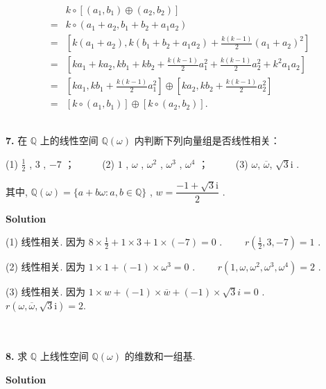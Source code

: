 \documentclass[11pt,a4paper,openany,oneside]{book}
\newcommand{\ii}{\mathrm i}
\newcommand\Solution{\noindent\textbf{\textsf{Solution}}\par\medskip}
\begin{document}
\begin{enumerate}[(\romannumeral1)]
\begin{align*}
&k\circ[(a_1,b_1)\oplus(a_2,b_2)]\\
=&k\circ(a_1+a_2,b_1+b_2+a_1a_2)\\
=&\left[k(a_1+a_2),k(b_1+b_2+a_1a_2)+\frac{k(k-1)}{2}(a_1+a_2)^2\right]\\
=&\left[ka_1+ka_2,kb_1+kb_2+\frac{k(k-1)}{2}a_1^2+\frac{k(k-1)}{2}a_2^2+k^2a_1a_2\right]\\
=&\left[ka_1,kb_1+\frac{k(k-1)}{2}a_1^2\right]\oplus\left[ka_2,kb_2+\frac{k(k-1)}{2}a_2^2\right]\\
=&[k\circ(a_1,b_1)]\oplus [k\circ(a_2,b_2)].\\ \\ \\
\end{align*}
\end{enumerate}




\begin{myexample}
\textbf{7.} 
在  $ \mathbb{Q} $ 上的线性空间  $ \mathbb{Q}(\omega) $ 内判断下列向量组是否线性相关： 

(1)  $ \frac{1}{2} $ ,  $ 3 $ ,  $ -7 $ ；  \ \ \ \ \ (2)  $ 1 $ ,  $ \omega $ ,  $ \omega^2 $ ,  $ \omega^3 $ ,  $ \omega^4 $ ；  \ \ \ \ \ (3)  $ \omega$, $\overline{\omega}$, $\sqrt{3}\ii $  . 

其中,  $ \mathbb{Q} (\omega) = \{a+b\omega: a, b \in \mathbb{Q} \} $ ,  $ w = \dfrac{-1+\sqrt{3}\ii}{2} $ . 
\end{myexample}
\Solution

(1) 线性相关. 因为 $ 8\times \frac{1}{2} + 1\times3 + 1\times(-7) = 0 $ . \ \ \ \  $ r(\tfrac{1}{2}, 3, -7) = 1 $ .

(2) 线性相关. 因为 $ 1\times1 + (-1)\times \omega^3 = 0 $  . \ \ \ \  $ r( 1, \omega, \omega^2, \omega^3, \omega^4)=2 $ . 

(3) 线性相关. 因为 $ 1\times w + (-1)\times \overline{w} + (-1)\times \sqrt{3}i = 0 $ . \ \ \ \  $ r(\omega, \overline{\omega}, \sqrt{3}\ii) = 2. $   \\  \\  \\




\begin{myexample}
	\textbf{8.}
求 $ \mathbb{Q} $ 上线性空间 $ \mathbb{Q}(\omega) $ 的维数和一组基.  

\end{myexample}
\Solution
\end{document}
